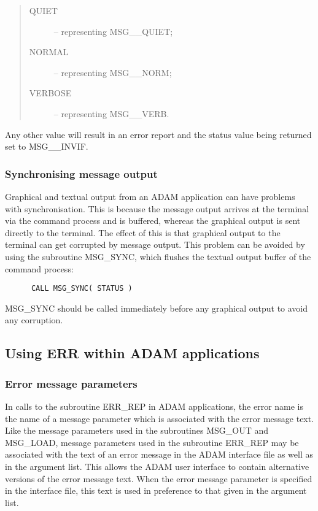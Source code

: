 \begin {quote}
\begin {description}
\item [QUIET] -- representing MSG\_\_QUIET;
\item [NORMAL] -- representing MSG\_\_NORM;
\item [VERBOSE] -- representing MSG\_\_VERB.
\end {description}
\end {quote}

Any other value will result in an error report and the status value being
returned set to MSG\_\_INVIF.


\subsubsection {Synchronising message output}

Graphical and textual output from an ADAM application can have problems with
synchronisation.
This is because the message output arrives at the terminal via the command
process and is buffered, whereas the graphical output is sent directly to the
terminal.
The effect of this is that graphical output to the terminal can get corrupted by
message output.
This problem can be avoided by using the subroutine MSG\_SYNC, which flushes
the textual output buffer of the command process:

\begin {small}
\begin{verbatim}
      CALL MSG_SYNC( STATUS )
\end{verbatim}
\end {small}

MSG\_SYNC should be called immediately before any graphical output to avoid any
corruption. 


\subsection {Using ERR within ADAM applications} \label{adam_err}

\subsubsection {Error message parameters}

In calls to the subroutine ERR\_REP in ADAM applications, the error name is the
name of a message parameter which is associated with the error message text.
Like the message parameters used in the subroutines MSG\_OUT and MSG\_LOAD,
message parameters used in the subroutine ERR\_REP may be associated with the
text of an error message in the ADAM interface file as well as in the argument
list.
This allows the ADAM user interface to contain alternative versions of the
error message text.
When the error message parameter is specified in the interface file, this text
is used in preference to that given in the argument list.


